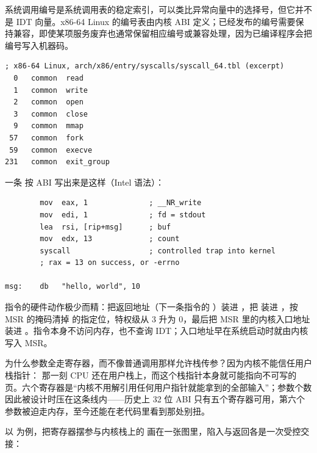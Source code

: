 系统调用编号是系统调用表的稳定索引，可以类比异常向量中的选择号，但它并不是 IDT 向量。x86-64 Linux 的编号表由内核 ABI 定义；已经发布的编号需要保持兼容，即使某项服务废弃也通常保留相应编号或兼容处理，因为已编译程序会把编号写入机器码。

\begin{lstlisting}
; x86-64 Linux, arch/x86/entry/syscalls/syscall_64.tbl (excerpt)
  0   common  read
  1   common  write
  2   common  open
  3   common  close
  9   common  mmap
 57   common  fork
 59   common  execve
231   common  exit_group
\end{lstlisting}

一条  按 ABI 写出来是这样（Intel 语法）：

\begin{lstlisting}
        mov  eax, 1              ; __NR_write
        mov  edi, 1              ; fd = stdout
        lea  rsi, [rip+msg]      ; buf
        mov  edx, 13             ; count
        syscall                  ; controlled trap into kernel
        ; rax = 13 on success, or -errno

msg:    db   "hello, world", 10
\end{lstlisting}

 指令的硬件动作极少而精：把返回地址（下一条指令的 ）装进 ，把  装进 ，按  MSR 的掩码清掉  的指定位，特权级从 3 升为 0，最后把  MSR 里的内核入口地址装进 。指令本身不访问内存，也不查询 IDT；入口地址早在系统启动时就由内核写入 MSR。\cite{intel-sdm}

为什么参数全走寄存器，而不像普通调用那样允许栈传参？因为内核不能信任用户栈指针： 那一刻 CPU 还在用户栈上，而这个栈指针本身就可能指向不可写的页。六个寄存器是“内核不用解引用任何用户指针就能拿到的全部输入”；参数个数因此被设计时压在这条线内——历史上 32 位 ABI 只有五个寄存器可用，第六个参数被迫走内存，至今还能在老代码里看到那处别扭。

以  为例，把寄存器摆参与内核栈上的  画在一张图里，陷入与返回各是一次受控交接：

